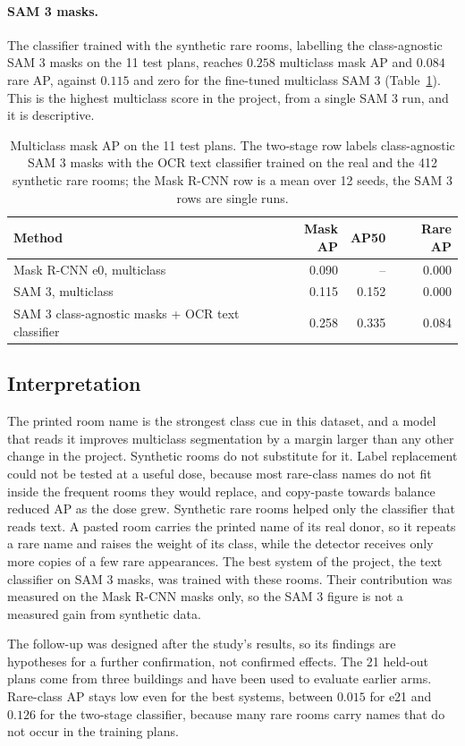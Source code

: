 \paragraph{SAM 3 masks.} The classifier trained with the synthetic rare rooms,
labelling the class-agnostic SAM 3 masks on the 11 test plans, reaches $0.258$ multiclass mask AP and $0.084$ rare
AP, against $0.115$ and zero for the fine-tuned multiclass SAM 3
(Table~\ref{tab:ocrsam3}). This is the highest multiclass score in the project,
from a single SAM 3 run, and it is descriptive.

\begin{table}[H]
\centering
\caption{Multiclass mask AP on the 11 test plans. The two-stage row labels
class-agnostic SAM 3 masks with the OCR text classifier trained on the real and
the 412 synthetic rare rooms; the Mask R-CNN row is a mean over 12 seeds, the
SAM 3 rows are single runs.}
\label{tab:ocrsam3}
\small
\begin{tabular}{@{}lrrr@{}}
\toprule
Method & Mask AP & AP50 & Rare AP \\
\midrule
Mask R-CNN e0, multiclass & 0.090 & -- & 0.000 \\
SAM 3, multiclass & 0.115 & 0.152 & 0.000 \\
SAM 3 class-agnostic masks + OCR text classifier & 0.258 & 0.335 & 0.084 \\
\bottomrule
\end{tabular}
\end{table}

\subsection{Interpretation}

The printed room name is the strongest class cue in this dataset, and a model
that reads it improves multiclass segmentation by a margin larger than any
other change in the project. Synthetic rooms do not substitute for it. Label
replacement could not be tested at a useful dose, because most rare-class names
do not fit inside the frequent rooms they would replace, and copy-paste towards
balance reduced AP as the dose grew. Synthetic rare rooms helped only the
classifier that reads text. A pasted room carries the printed name of its real
donor, so it repeats a rare name and raises the weight of its class, while the
detector receives only more copies of a few rare appearances. The best system
of the project, the text classifier on SAM 3 masks, was trained with these
rooms. Their contribution was measured on the Mask R-CNN masks only, so the
SAM 3 figure is not a measured gain from synthetic data.

The follow-up was designed after the study's results, so its findings are hypotheses for a further confirmation, not confirmed effects.
The 21 held-out plans come from three buildings and have been used to evaluate
earlier arms. Rare-class AP stays low even for the best systems, between
$0.015$ for e21 and $0.126$ for the two-stage classifier, because many rare
rooms carry names that do not occur in the training plans.
